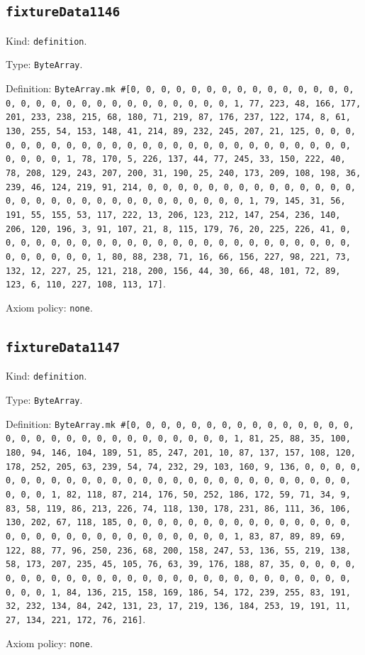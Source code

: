 \documentclass[11pt]{article}
\begin{document}
\subsection*{\texttt{fixtureData1146}}
\noindent Kind: \texttt{definition}.\par
\noindent Type: \texttt{ByteArray}.\par
\noindent Definition: \texttt{ByteArray.mk \#[0, 0, 0, 0, 0, 0, 0, 0, 0, 0, 0, 0, 0, 0, 0, 0, 0, 0, 0, 0, 0, 0, 0, 0, 0, 0, 0, 0, 0, 0, 1, 77, 223, 48, 166, 177, 201, 233, 238, 215, 68, 180, 71, 219, 87, 176, 237, 122, 174, 8, 61, 130, 255, 54, 153, 148, 41, 214, 89, 232, 245, 207, 21, 125, 0, 0, 0, 0, 0, 0, 0, 0, 0, 0, 0, 0, 0, 0, 0, 0, 0, 0, 0, 0, 0, 0, 0, 0, 0, 0, 0, 0, 0, 0, 1, 78, 170, 5, 226, 137, 44, 77, 245, 33, 150, 222, 40, 78, 208, 129, 243, 207, 200, 31, 190, 25, 240, 173, 209, 108, 198, 36, 239, 46, 124, 219, 91, 214, 0, 0, 0, 0, 0, 0, 0, 0, 0, 0, 0, 0, 0, 0, 0, 0, 0, 0, 0, 0, 0, 0, 0, 0, 0, 0, 0, 0, 0, 0, 1, 79, 145, 31, 56, 191, 55, 155, 53, 117, 222, 13, 206, 123, 212, 147, 254, 236, 140, 206, 120, 196, 3, 91, 107, 21, 8, 115, 179, 76, 20, 225, 226, 41, 0, 0, 0, 0, 0, 0, 0, 0, 0, 0, 0, 0, 0, 0, 0, 0, 0, 0, 0, 0, 0, 0, 0, 0, 0, 0, 0, 0, 0, 0, 1, 80, 88, 238, 71, 16, 66, 156, 227, 98, 221, 73, 132, 12, 227, 25, 121, 218, 200, 156, 44, 30, 66, 48, 101, 72, 89, 123, 6, 110, 227, 108, 113, 17]}.\par
\noindent Axiom policy: \texttt{none}.\par
\subsection*{\texttt{fixtureData1147}}
\noindent Kind: \texttt{definition}.\par
\noindent Type: \texttt{ByteArray}.\par
\noindent Definition: \texttt{ByteArray.mk \#[0, 0, 0, 0, 0, 0, 0, 0, 0, 0, 0, 0, 0, 0, 0, 0, 0, 0, 0, 0, 0, 0, 0, 0, 0, 0, 0, 0, 0, 0, 1, 81, 25, 88, 35, 100, 180, 94, 146, 104, 189, 51, 85, 247, 201, 10, 87, 137, 157, 108, 120, 178, 252, 205, 63, 239, 54, 74, 232, 29, 103, 160, 9, 136, 0, 0, 0, 0, 0, 0, 0, 0, 0, 0, 0, 0, 0, 0, 0, 0, 0, 0, 0, 0, 0, 0, 0, 0, 0, 0, 0, 0, 0, 0, 1, 82, 118, 87, 214, 176, 50, 252, 186, 172, 59, 71, 34, 9, 83, 58, 119, 86, 213, 226, 74, 118, 130, 178, 231, 86, 111, 36, 106, 130, 202, 67, 118, 185, 0, 0, 0, 0, 0, 0, 0, 0, 0, 0, 0, 0, 0, 0, 0, 0, 0, 0, 0, 0, 0, 0, 0, 0, 0, 0, 0, 0, 0, 0, 1, 83, 87, 89, 89, 69, 122, 88, 77, 96, 250, 236, 68, 200, 158, 247, 53, 136, 55, 219, 138, 58, 173, 207, 235, 45, 105, 76, 63, 39, 176, 188, 87, 35, 0, 0, 0, 0, 0, 0, 0, 0, 0, 0, 0, 0, 0, 0, 0, 0, 0, 0, 0, 0, 0, 0, 0, 0, 0, 0, 0, 0, 0, 0, 1, 84, 136, 215, 158, 169, 186, 54, 172, 239, 255, 83, 191, 32, 232, 134, 84, 242, 131, 23, 17, 219, 136, 184, 253, 19, 191, 11, 27, 134, 221, 172, 76, 216]}.\par
\noindent Axiom policy: \texttt{none}.\par
\end{document}
